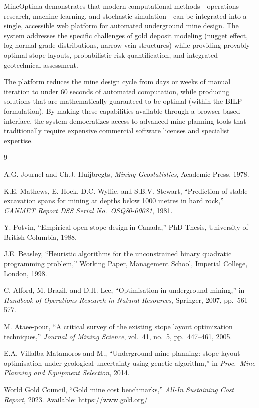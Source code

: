 \documentclass[12pt,a4paper]{article}
\begin{document}
MineOptima demonstrates that modern computational methods---operations research, machine learning, and stochastic simulation---can be integrated into a single, accessible web platform for automated underground mine design. The system addresses the specific challenges of gold deposit modeling (nugget effect, log-normal grade distributions, narrow vein structures) while providing provably optimal stope layouts, probabilistic risk quantification, and integrated geotechnical assessment.

The platform reduces the mine design cycle from days or weeks of manual iteration to under 60 seconds of automated computation, while producing solutions that are mathematically guaranteed to be optimal (within the BILP formulation). By making these capabilities available through a browser-based interface, the system democratizes access to advanced mine planning tools that traditionally require expensive commercial software licenses and specialist expertise.

\begin{thebibliography}{9}

A.G. Journel and Ch.J. Huijbregts, \textit{Mining Geostatistics}, Academic Press, 1978.

K.E. Mathews, E. Hoek, D.C. Wyllie, and S.B.V. Stewart, ``Prediction of stable excavation spans for mining at depths below 1000 metres in hard rock,'' \textit{CANMET Report DSS Serial No.\ OSQ80-00081}, 1981.

Y. Potvin, ``Empirical open stope design in Canada,'' PhD Thesis, University of British Columbia, 1988.

J.E. Beasley, ``Heuristic algorithms for the unconstrained binary quadratic programming problem,'' Working Paper, Management School, Imperial College, London, 1998.

C. Alford, M. Brazil, and D.H. Lee, ``Optimisation in underground mining,'' in \textit{Handbook of Operations Research in Natural Resources}, Springer, 2007, pp.\ 561--577.

M. Ataee-pour, ``A critical survey of the existing stope layout optimization techniques,'' \textit{Journal of Mining Science}, vol.\ 41, no.\ 5, pp.\ 447--461, 2005.

E.A. Villalba Matamoros and M., ``Underground mine planning: stope layout optimisation under geological uncertainty using genetic algorithm,'' in \textit{Proc.\ Mine Planning and Equipment Selection}, 2014.

World Gold Council, ``Gold mine cost benchmarks,'' \textit{All-In Sustaining Cost Report}, 2023. Available: \url{https://www.gold.org/}

\end{thebibliography}
\end{document}
